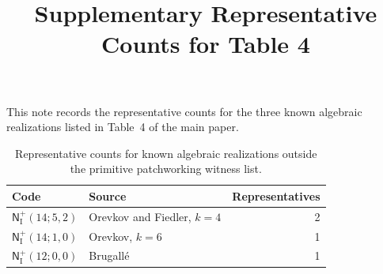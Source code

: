 \documentclass[11pt]{article}
\title{Supplementary Representative Counts for Table 4}
\date{}
\begin{document}
\maketitle

This note records the representative counts for the three known algebraic
realizations listed in Table~4 of the main paper.

\begin{table}[ht]
\centering
\begin{tabular}{@{}llr@{}}
\toprule
Code & Source & Representatives \\
\midrule
$\mathsf N_{\mathrm I}^{+}(14;5,2)$ & Orevkov and Fiedler, $k=4$ & 2 \\
$\mathsf N_{\mathrm I}^{+}(14;1,0)$ & Orevkov, $k=6$ & 1 \\
$\mathsf N_{\mathrm I}^{+}(12;0,0)$ & Brugall\'e & 1 \\
\bottomrule
\end{tabular}
\caption{Representative counts for known algebraic realizations outside the primitive patchworking witness list.}
\end{table}
\end{document}
